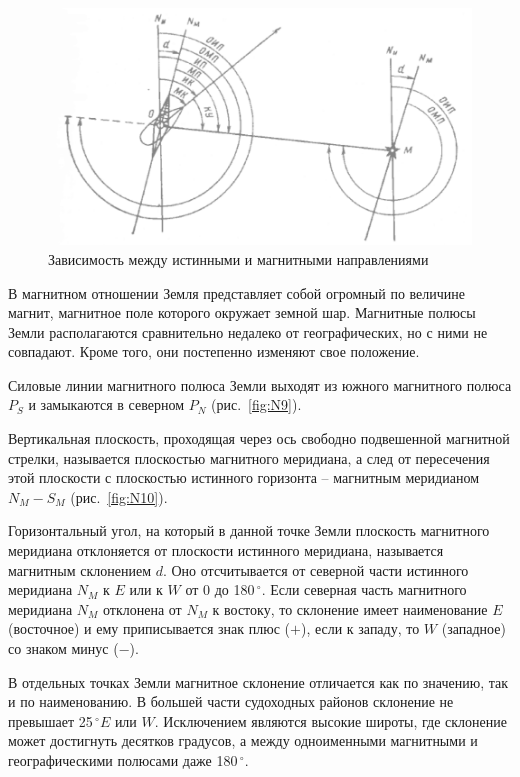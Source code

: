 \documentclass[a4paper, 12pt, twoside, final, book, russian, fittopage, cyremdash]{ncc}
\newcommand{\gr}{\ensuremath{\,^\circ}\xspace}
\newcommand{\ris}[1]{\ref{fig:#1}}
\begin{document}
\begin{figure}[htb]
  \centering{}
  \includegraphics{N011}
  \caption{Зависимость между истинными и магнитными направлениями}
  \label{fig:N11}
\end{figure}

В магнитном отношении Земля представляет собой огромный по величине магнит, магнитное поле которого окружает земной шар. Магнитные полюсы Земли располагаются сравнительно недалеко от географических, но с ними не совпадают. Кроме того, они постепенно изменяют свое положение. 

Силовые линии магнитного полюса Земли выходят из южного магнитного полюса $P_S$ и замыкаются в северном $P_N$ (рис.~\ris{N9}). 

Вертикальная плоскость, проходящая через ось свободно подвешенной магнитной стрелки, называется плоскостью магнитного меридиана, а след от пересечения этой плоскости с плоскостью истинного горизонта \--- магнитным меридианом $N_M - S_M$ (рис.~\ris{N10}). 

Горизонтальный угол, на который в данной точке Земли плоскость магнитного меридиана отклоняется от плоскости истинного меридиана, называется магнитным склонением $d$. Оно отсчитывается от северной части истинного меридиана $N_M$ к $E$ или к $W$ от 0 до 180\gr. Если северная часть магнитного меридиана $N_M$ отклонена от $N_M$ к востоку, то склонение имеет наименование $E$ (восточное) и ему приписывается знак плюс ($+$), если к западу, то $W$ (западное) со знаком минус ($-$). 

В отдельных точках Земли магнитное склонение отличается как по значению, так и по наименованию. В большей части судоходных районов склонение не превышает 25\gr $E$ или $W$. Исключением являются высокие широты, где склонение может достигнуть десятков градусов, а между одноименными магнитными и географическими полюсами даже 180\gr.
\end{document}
